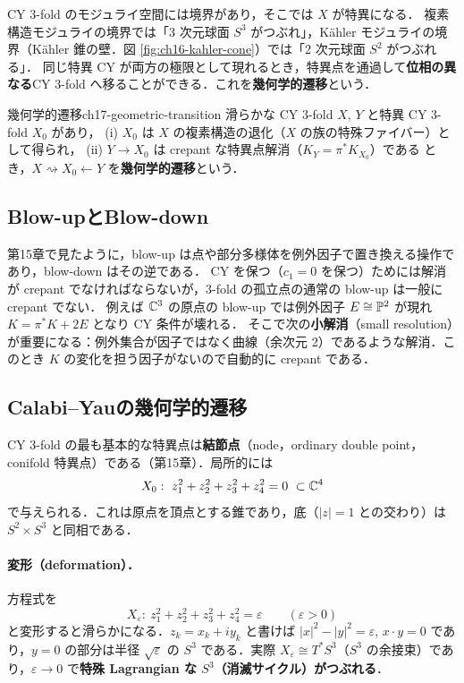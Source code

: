 CY 3-fold のモジュライ空間には境界があり，そこでは $X$ が特異になる．
複素構造モジュライの境界では「3 次元球面 $S^3$ がつぶれ」，K\"ahler モジュライの境界（K\"ahler 錐の壁．図 \ref{fig:ch16-kahler-cone}）では「2 次元球面 $S^2$ がつぶれる」．
同じ特異 CY が両方の極限として現れるとき，特異点を通過して\textbf{位相の異なる}CY 3-fold へ移ることができる．これを\textbf{幾何学的遷移}という．

\begin{mydef}{幾何学的遷移}{ch17-geometric-transition}
滑らかな CY 3-fold $X$, $Y$ と特異 CY 3-fold $X_0$ があり，
(i) $X_0$ は $X$ の複素構造の退化（$X$ の族の特殊ファイバー）として得られ，
(ii) $Y\to X_0$ は crepant な特異点解消（$K_Y=\pi^*K_{X_0}$）である
とき，$X\rightsquigarrow X_0\leftarrow Y$ を\textbf{幾何学的遷移}という．
\end{mydef}

\subsection{Blow-upとBlow-down}

第15章で見たように，blow-up は点や部分多様体を例外因子で置き換える操作であり，blow-down はその逆である．
CY を保つ（$c_1=0$ を保つ）ためには解消が crepant でなければならないが，3-fold の孤立点の通常の blow-up は一般に crepant でない．
例えば $\mathbb{C}^3$ の原点の blow-up では例外因子 $E\cong\mathbb{P}^2$ が現れ $K=\pi^*K+2E$ となり CY 条件が壊れる．
そこで次の\textbf{小解消}（small resolution）が重要になる：例外集合が因子ではなく曲線（余次元 2）であるような解消．このとき $K$ の変化を担う因子がないので自動的に crepant である．

\subsection{Calabi--Yauの幾何学的遷移}

CY 3-fold の最も基本的な特異点は\textbf{結節点}（node，ordinary double point，conifold 特異点）である（第15章）．局所的には
\begin{equation}
X_0:\ z_1^2+z_2^2+z_3^2+z_4^2=0\ \subset\mathbb{C}^4
\label{eq:ch17-conifold}
\end{equation}
で与えられる．これは原点を頂点とする錐であり，底（$|z|=1$ との交わり）は $S^2\times S^3$ と同相である．

\paragraph{変形（deformation）．}
方程式を
\[
X_\varepsilon:\ z_1^2+z_2^2+z_3^2+z_4^2=\varepsilon\qquad(\varepsilon>0)
\]
と変形すると滑らかになる．$z_k=x_k+iy_k$ と書けば $|x|^2-|y|^2=\varepsilon$, $x\cdot y=0$ であり，$y=0$ の部分は半径 $\sqrt\varepsilon$ の $S^3$ である．実際 $X_\varepsilon\cong T^*S^3$（$S^3$ の余接束）であり，$\varepsilon\to0$ で\textbf{特殊 Lagrangian な $S^3$（消滅サイクル）がつぶれる}．

